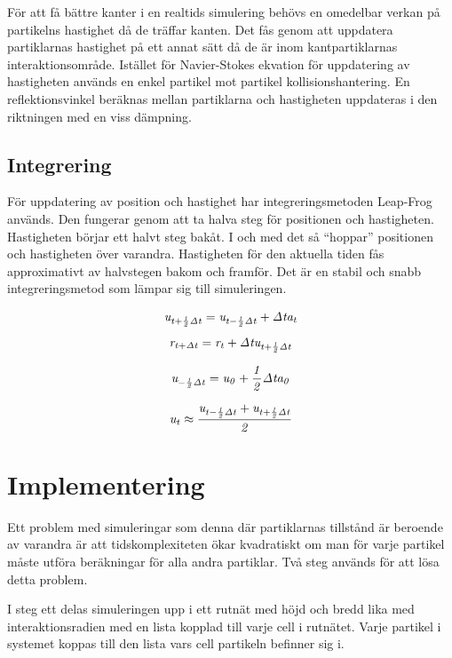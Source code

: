 \documentclass[a4paper,12pt,oneside,final]{extarticle}
\begin{document}
För att få bättre kanter i en realtids simulering behövs en omedelbar verkan på partikelns hastighet då de träffar kanten.
Det fås genom att uppdatera partiklarnas hastighet på ett annat sätt då de är inom kantpartiklarnas interaktionsområde.
Istället för Navier-Stokes ekvation för uppdatering av hastigheten används en enkel partikel mot partikel kollisionshantering.
En reflektionsvinkel beräknas mellan partiklarna och hastigheten uppdateras i den riktningen med en viss dämpning.

\subsection{Integrering}
För uppdatering av position och hastighet har integreringsmetoden Leap-Frog~\cite{kelager} används. Den fungerar genom att ta halva steg för positionen och hastigheten.
Hastigheten börjar ett halvt steg bakåt.
I och med det så “hoppar” positionen och hastigheten över varandra.
Hastigheten för den aktuella tiden fås approximativt av halvstegen bakom och framför.
Det är en stabil och snabb integreringsmetod som lämpar sig till simuleringen.

\begin{equation}
{\it u_{t + \frac{1}{2} \Delta t} = u_{t - \frac{1}{2} \Delta t} + \Delta t a_t}
\end{equation}
\begin{equation}
{\it r_{t+ \Delta t} = r_t + \Delta t u_{t + \frac{1}{2} \Delta t }}
\end{equation}

\begin{equation}
{\it u_{-\frac{1}{2} \Delta t} = u_{0} + \frac{1}{2} \Delta t a_0}
\end{equation}

\begin{equation}
{\it u_t \approx \frac{u_{t - \frac{1}{2} \Delta t} + u_{t + \frac{1}{2} \Delta t} }{2} }
\end{equation}

\clearpage
\section{Implementering}
Ett problem med simuleringar som denna där partiklarnas tillstånd är beroende av varandra är att tidskomplexiteten ökar kvadratiskt om man för varje partikel måste utföra beräkningar för alla andra partiklar.
Två steg används för att lösa detta problem.

I steg ett delas simuleringen upp i ett rutnät med höjd och bredd lika med interaktionsradien med en lista kopplad till varje cell i rutnätet.
Varje partikel i systemet koppas till den lista vars cell partikeln befinner sig i.
\end{document}

